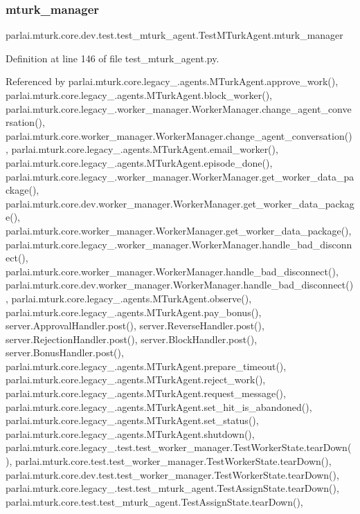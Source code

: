 \subsubsection{\texorpdfstring{mturk\+\_\+manager}{mturk\_manager}}
{\footnotesize\ttfamily parlai.\+mturk.\+core.\+dev.\+test.\+test\+\_\+mturk\+\_\+agent.\+Test\+M\+Turk\+Agent.\+mturk\+\_\+manager}



Definition at line 146 of file test\+\_\+mturk\+\_\+agent.\+py.



Referenced by parlai.\+mturk.\+core.\+legacy\+\_.\+agents.\+M\+Turk\+Agent.\+approve\+\_\+work(), parlai.\+mturk.\+core.\+legacy\+\_.\+agents.\+M\+Turk\+Agent.\+block\+\_\+worker(), parlai.\+mturk.\+core.\+legacy\+\_.\+worker\+\_\+manager.\+Worker\+Manager.\+change\+\_\+agent\+\_\+conversation(), parlai.\+mturk.\+core.\+worker\+\_\+manager.\+Worker\+Manager.\+change\+\_\+agent\+\_\+conversation(), parlai.\+mturk.\+core.\+legacy\+\_.\+agents.\+M\+Turk\+Agent.\+email\+\_\+worker(), parlai.\+mturk.\+core.\+legacy\+\_.\+agents.\+M\+Turk\+Agent.\+episode\+\_\+done(), parlai.\+mturk.\+core.\+legacy\+\_.\+worker\+\_\+manager.\+Worker\+Manager.\+get\+\_\+worker\+\_\+data\+\_\+package(), parlai.\+mturk.\+core.\+dev.\+worker\+\_\+manager.\+Worker\+Manager.\+get\+\_\+worker\+\_\+data\+\_\+package(), parlai.\+mturk.\+core.\+worker\+\_\+manager.\+Worker\+Manager.\+get\+\_\+worker\+\_\+data\+\_\+package(), parlai.\+mturk.\+core.\+legacy\+\_.\+worker\+\_\+manager.\+Worker\+Manager.\+handle\+\_\+bad\+\_\+disconnect(), parlai.\+mturk.\+core.\+worker\+\_\+manager.\+Worker\+Manager.\+handle\+\_\+bad\+\_\+disconnect(), parlai.\+mturk.\+core.\+dev.\+worker\+\_\+manager.\+Worker\+Manager.\+handle\+\_\+bad\+\_\+disconnect(), parlai.\+mturk.\+core.\+legacy\+\_.\+agents.\+M\+Turk\+Agent.\+observe(), parlai.\+mturk.\+core.\+legacy\+\_.\+agents.\+M\+Turk\+Agent.\+pay\+\_\+bonus(), server.\+Approval\+Handler.\+post(), server.\+Reverse\+Handler.\+post(), server.\+Rejection\+Handler.\+post(), server.\+Block\+Handler.\+post(), server.\+Bonus\+Handler.\+post(), parlai.\+mturk.\+core.\+legacy\+\_.\+agents.\+M\+Turk\+Agent.\+prepare\+\_\+timeout(), parlai.\+mturk.\+core.\+legacy\+\_.\+agents.\+M\+Turk\+Agent.\+reject\+\_\+work(), parlai.\+mturk.\+core.\+legacy\+\_.\+agents.\+M\+Turk\+Agent.\+request\+\_\+message(), parlai.\+mturk.\+core.\+legacy\+\_.\+agents.\+M\+Turk\+Agent.\+set\+\_\+hit\+\_\+is\+\_\+abandoned(), parlai.\+mturk.\+core.\+legacy\+\_.\+agents.\+M\+Turk\+Agent.\+set\+\_\+status(), parlai.\+mturk.\+core.\+legacy\+\_.\+agents.\+M\+Turk\+Agent.\+shutdown(), parlai.\+mturk.\+core.\+legacy\+\_.\+test.\+test\+\_\+worker\+\_\+manager.\+Test\+Worker\+State.\+tear\+Down(), parlai.\+mturk.\+core.\+test.\+test\+\_\+worker\+\_\+manager.\+Test\+Worker\+State.\+tear\+Down(), parlai.\+mturk.\+core.\+dev.\+test.\+test\+\_\+worker\+\_\+manager.\+Test\+Worker\+State.\+tear\+Down(), parlai.\+mturk.\+core.\+legacy\+\_.\+test.\+test\+\_\+mturk\+\_\+agent.\+Test\+Assign\+State.\+tear\+Down(), parlai.\+mturk.\+core.\+test.\+test\+\_\+mturk\+\_\+agent.\+Test\+Assign\+State.\+tear\+Down(), 